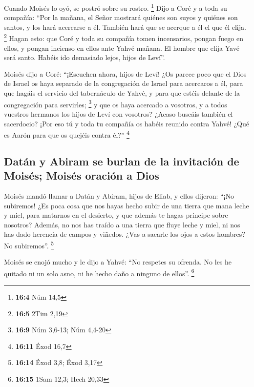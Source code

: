  Cuando Moisés lo oyó, se postró sobre su rostro.
\footnote{\textbf{16:4} Núm 14,5}  Dijo a Coré y a toda su
compañía: ``Por la mañana, el Señor mostrará quiénes son suyos y quiénes
son santos, y los hará acercarse a él. También hará que se acerque a él
el que él elija. \footnote{\textbf{16:5} 2Tim 2,19}  Hagan
esto: que Coré y toda su compañía tomen incensarios, 
pongan fuego en ellos, y pongan incienso en ellos ante Yahvé mañana. El
hombre que elija Yavé será santo. Habéis ido demasiado lejos, hijos de
Leví''.

 Moisés dijo a Coré: ``¡Escuchen ahora, hijos de Leví!
 ¿Os parece poco que el Dios de Israel os haya separado de
la congregación de Israel para acercaros a él, para que hagáis el
servicio del tabernáculo de Yahvé, y para que estéis delante de la
congregación para servirles; \footnote{\textbf{16:9} Núm 3,6-13; Núm
  4,4-20}  y que os haya acercado a vosotros, y a todos
vuestros hermanos los hijos de Leví con vosotros? ¿Acaso buscáis también
el sacerdocio?  ¡Por eso tú y toda tu compañía os habéis
reunido contra Yahvé! ¿Qué es Aarón para que os quejéis contra él?''
\footnote{\textbf{16:11} Éxod 16,7}

\hypertarget{datuxe1n-y-abiram-se-burlan-de-la-invitaciuxf3n-de-moisuxe9s-moisuxe9s-oraciuxf3n-a-dios}{%
\subsection{Datán y Abiram se burlan de la invitación de Moisés; Moisés
oración a
Dios}\label{datuxe1n-y-abiram-se-burlan-de-la-invitaciuxf3n-de-moisuxe9s-moisuxe9s-oraciuxf3n-a-dios}}

 Moisés mandó llamar a Datán y Abiram, hijos de Eliab, y
ellos dijeron: ``¡No subiremos!  ¿Es poca cosa que nos
hayas hecho subir de una tierra que mana leche y miel, para matarnos en
el desierto, y que además te hagas príncipe sobre nosotros?
 Además, no nos has traído a una tierra que fluye leche y
miel, ni nos has dado herencia de campos y viñedos. ¿Vas a sacarle los
ojos a estos hombres? No subiremos''. \footnote{\textbf{16:14} Éxod 3,8;
  Éxod 3,17}

 Moisés se enojó mucho y le dijo a Yahvé: ``No respetes
su ofrenda. No les he quitado ni un solo asno, ni he hecho daño a
ninguno de ellos''. \footnote{\textbf{16:15} 1Sam 12,3; Hech 20,33}

